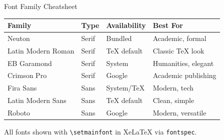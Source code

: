 \documentclass[10pt]{beamer}
\begin{document}
\begin{frame}{Font Family Cheatsheet}
  \centering
  \small
  \begin{tabular}{l l l l}
    \toprule
    \textbf{Family} & \textbf{Type} & \textbf{Availability} & \textbf{Best For} \\
    \midrule
    Neuton & Serif & Bundled & Academic, formal \\
    Latin Modern Roman & Serif & TeX default & Classic TeX look \\
    EB Garamond & Serif & System & Humanities, elegant \\
    Crimson Pro & Serif & Google & Academic publishing \\
    \midrule
    Fira Sans & Sans & System/TeX & Modern, tech \\
    Latin Modern Sans & Sans & TeX default & Clean, simple \\
    Roboto & Sans & Google & Modern, versatile \\
    \bottomrule
  \end{tabular}

  \vspace{0.3cm}
  \footnotesize
  All fonts shown with \texttt{\textbackslash setmainfont} in XeLaTeX via \texttt{fontspec}.
\end{frame}
\end{document}
